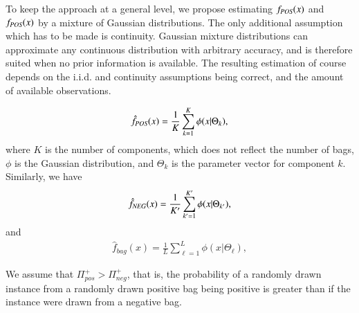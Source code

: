 To keep the approach at a general level, we propose estimating $f_{\text{\scriptsize{{\it POS}}}}(x)$ and $f_{\text{\scriptsize{{\it POS}}}}(x)$ by a mixture of Gaussian distributions. 
The only additional assumption which has to be made is continuity. 
Gaussian mixture distributions can approximate any continuous distribution with arbitrary accuracy, and is therefore suited when no prior information is available. 
The resulting estimation of course depends on the i.i.d. and continuity assumptions being correct, and the amount of available observations. 

\begin{align}
  \hat{f}_{\text{\scriptsize{{\it POS}}}}(x) = \frac{1}{K}\sum_{k = 1}^K  \phi(x|\Theta_k), 
\end{align}
where $K$ is the number of components, which does not reflect the number of bags, $\phi$ is the Gaussian distribution, and $\Theta_k$ is the parameter vector for component $k$. 
Similarly, we have
\begin{align}
  \hat{f}_{\text{\scriptsize{{\it NEG}}}}(x) = \frac{1}{K'}\sum_{{k'} = 1}^{K'}  \phi(x|\Theta_{k'}), 
\end{align}
and
\begin{align}
  \hat{f}_{bag}(x) = \frac{1}{L}\sum_{\ell = 1}^{L}  \phi(x|\Theta_\ell), 
\end{align}




{\color{red} We assume that $\Pi_{pos}^+ > \Pi_{neg}^+$, that is, the probability of a randomly drawn instance from a randomly drawn positive bag being positive is greater than if the instance were drawn from a negative bag. }
